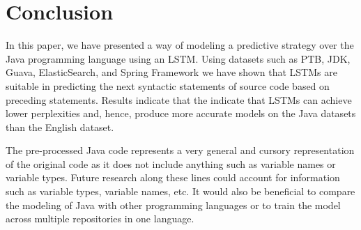 \documentclass[runningheads,a4paper]{llncs}
\begin{document}
\section{Conclusion}

In this paper, we have presented a way of modeling a predictive strategy
over the Java programming language using an LSTM. Using datasets such as PTB,
JDK, Guava, ElasticSearch, and Spring Framework we have shown that
LSTMs are suitable in predicting the next syntactic statements of source
code based on preceding statements. Results indicate that the indicate
that LSTMs can achieve lower perplexities and, hence, produce more accurate models
on the Java datasets than the English dataset.

The pre-processed Java code represents a very general and cursory
representation of the original code as it does not include anything such
as variable names or variable types. Future research along these lines
could account for information such as variable types, variable names, etc.
It would also be beneficial to compare the modeling of Java with other
programming languages or to train the model across multiple repositories
in one language.
\end{document}
